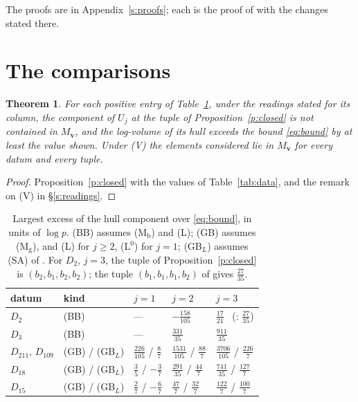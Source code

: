 \documentclass[11pt]{amsart}
\newtheorem{theorem}{Theorem}
\theoremstyle{remark}
\newcommand{\bv}{\mathbf v}
\begin{document}
The proofs are in Appendix~\ref{s:proofs}; each is the proof of \cite[Prop.~2]{Note} with the changes stated there.

\section{The comparisons}\label{s:comparisons}

\begin{theorem}\label{t:component}
For each positive entry of Table~\ref{tab:component}, under the readings stated for its column, the component of $U_j$
at the tuple of Proposition~\ref{p:closed} is not contained in $M_{\bv}$, and the log-volume of its hull exceeds the
bound \eqref{eq:bound} by at least the value shown. Under (V) the elements considered lie in $M_{\bv}$ for every
datum and every tuple.
\end{theorem}

\begin{proof}
Proposition~\ref{p:closed} with the values of Table~\ref{tab:data}, and the remark on (V) in \S\ref{s:readings}.
\end{proof}

\begin{table}[ht]
\centering\small
\begin{tabular}{@{}lllll@{}}
\toprule
datum & kind & $j=1$ & $j=2$ & $j=3$\\
\midrule
$D_2$ & (BB) & --- & $-\tfrac{158}{105}$ & $\tfrac{17}{21}$ \ (\cite[Thm.~5]{Note}: $\tfrac{27}{35}$)\\
$D_3$ & (BB) & --- & $\tfrac{331}{35}$ & $\tfrac{911}{35}$\\
$D_{211}$, $D_{109}$ & (GB) / (GB$_L$) & $\tfrac{226}{105}$ / $\tfrac87$ & $\tfrac{1531}{105}$ / $\tfrac{88}7$ & $\tfrac{3706}{105}$ / $\tfrac{226}7$\\
$D_{18}$ & (GB) / (GB$_L$) & $\tfrac35$ / $-\tfrac37$ & $\tfrac{291}{35}$ / $\tfrac{44}7$ & $\tfrac{741}{35}$ / $\tfrac{127}7$\\
$D_{15}$ & (GB) / (GB$_L$) & $\tfrac27$ / $-\tfrac67$ & $\tfrac{47}7$ / $\tfrac{32}7$ & $\tfrac{122}7$ / $\tfrac{100}7$\\
\bottomrule
\end{tabular}
\caption{Largest excess of the hull component over \eqref{eq:bound}, in units of $\log p$. (BB) assumes (M$_{\mathrm b}$)
and (L); (GB) assumes (M$_{\mathrm g}$), and (L) for $j\ge2$, (L$^0$) for $j=1$; (GB$_L$) assumes (SA) of
\cite{FirstFull}. For $D_2$, $j=3$, the tuple of Proposition~\ref{p:closed} is $(b_2,b_1,b_2,b_2)$; the tuple
$(b_1,b_1,b_1,b_2)$ of \cite[Thm.~5]{Note} gives $\tfrac{27}{35}$.}\label{tab:component}
\end{table}
\end{document}

